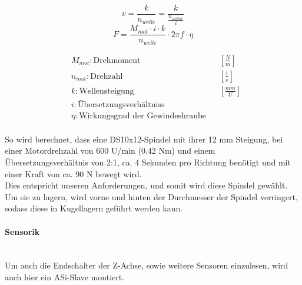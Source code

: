 \vspace{5mm}
\noindent\begin{minipage}{\textwidth}
\begin{minipage}[t]{0.5\textwidth}
    \vspace{10mm}
    \begin{equation*}
        v = \frac{k}{n_{welle}} = \frac{k}{\frac{n_{motor}}{i}}
    \end{equation*}
    \begin{equation*}
        F = \frac{M_{mot} \cdot i \cdot k}{n_{welle}} \cdot 2 \pi f \cdot \eta 
    \end{equation*}
\end{minipage}%
\begin{minipage}[t]{0.5\textwidth}
    \vspace{-7mm}
    \begin{align*}
        &M_{mot}: \text{Drehmoment} & &\left[\frac{N}{m}\right]\\
        &n_{mot}: \text{Drehzahl} & &\left[\frac{1}{s}\right]\\
        &k: \text{Wellensteigung} & &\left[\frac{mm}{U}\right]\\
        &i: \text{Übersetzungsverhältniss} & \\
        &\eta: \text{Wirkungsgrad der Gewindeshraube} & \\
    \end{align*}
\end{minipage}
\end{minipage}

\vspace{5mm}

So wird berechnet, dass eine DS10x12-Spindel mit ihrer 12 mm Steigung, bei einer Motordrehzahl von 600 U/min (0.42 Nm) und einem Übersetzungsverhältnis von 2:1, ca. 4 Sekunden pro Richtung benötigt und mit einer Kraft von ca. 90 N bewegt wird.\\
Dies entspricht unseren Anforderungen, und somit wird diese Spindel gewählt. Um sie zu lagern, wird vorne und hinten der Durchmesser der Spindel verringert, sodass diese in Kugellagern geführt werden kann.

\paragraph{Sensorik}\mbox{}\\
Um auch die Endschalter der Z-Achse, sowie weitere Sensoren einzulesen, wird auch hier ein ASi-Slave montiert.

